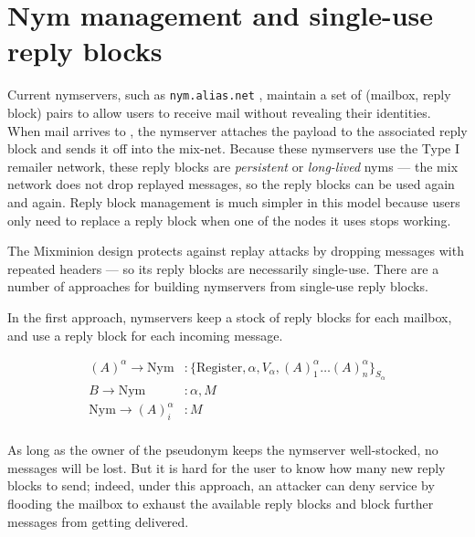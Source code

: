 \documentclass[11pt]{IEEEtran}
\newcommand\emailaddr{\begingroup \def\UrlLeft{<}\def\UrlRight{>}\urlstyle{tt}\Url}
\begin{document}


\section{Nym management and single-use reply blocks}
\label{sec:nymservers}

Current nymservers, such as {\tt nym.alias.net} \cite{nym-alias-net},
maintain a set of (mailbox, reply block) pairs to allow users to
receive mail without revealing their identities. When mail arrives to
\emailaddr{bob@nym.alias.net}, the nymserver attaches the payload to
the associated
reply block and sends it off into the mix-net. Because these nymservers
use the Type I remailer network, these reply blocks are \emph{persistent}
or \emph{long-lived} nyms --- the mix network does not drop replayed
messages, so the reply blocks can be used again and again. Reply block
management is much simpler in this model because users only need to
replace a reply block when one of the nodes it uses stops working.

The Mixminion design protects against replay attacks by dropping
messages with repeated headers --- so its reply blocks are necessarily
single-use. There are a number of approaches for building nymservers
from single-use reply blocks.

In the first approach, nymservers keep a stock of reply blocks for
each mailbox, and use a reply block for each incoming message. 

\begin{equation}
\begin{aligned}
(A)^\alpha \rightarrow \mathrm{Nym}&: \{\mathrm{Register} , \alpha, V_{\alpha}, (A)^\alpha_1 \dots
(A)^\alpha_n\}_{S_\alpha} \\ 
B \rightarrow \mathrm{Nym}&: \alpha, M \\ 
\mathrm{Nym} \rightarrow (A)^\alpha_i&: M \\
\end{aligned}
\end{equation}

As long
as the owner of the pseudonym keeps the nymserver well-stocked, no
messages will be lost.  But it is hard for the user to know how many
new reply blocks to send; indeed, under this approach, an attacker can
deny service by flooding the mailbox to exhaust the available
reply blocks and block further messages from getting delivered.
\end{document}
